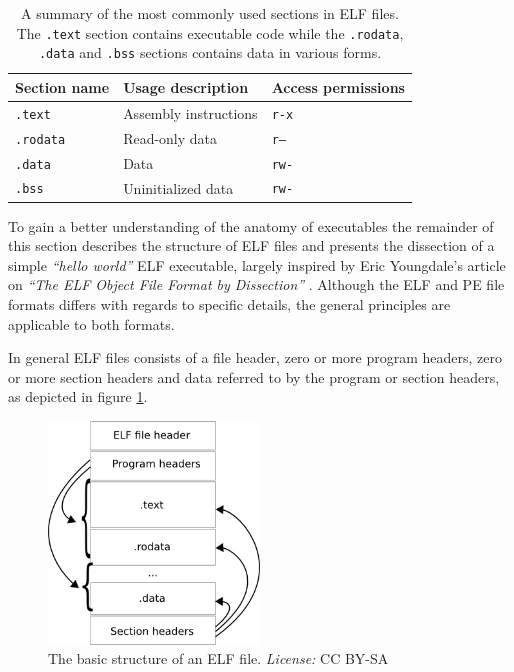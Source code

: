 \documentclass[12pt, a4paper]{article}
\begin{document}
\begin{table}[htbp]
	\begin{center}
		\begin{tabular}{|l|l|l|}
			\hline
			Section name & Usage description & Access permissions \\
			\hline
			\texttt{.text} & Assembly instructions & \texttt{r-x} \\
			\texttt{.rodata} & Read-only data & \texttt{r--} \\
			\texttt{.data} & Data & \texttt{rw-} \\
			\texttt{.bss} & Uninitialized data & \texttt{rw-} \\
			\hline
		\end{tabular}
	\end{center}
	\caption{A summary of the most commonly used sections in ELF files. The \texttt{.text} section contains executable code while the \texttt{.rodata}, \texttt{.data} and \texttt{.bss} sections contains data in various forms.}
	\label{sections}
\end{table}

To gain a better understanding of the anatomy of executables the remainder of this section describes the structure of ELF files and presents the dissection of a simple \textit{``hello world''} ELF executable, largely inspired by Eric Youngdale's article on \textit{``The ELF Object File Format by Dissection''} \cite{elf_dissection}. Although the ELF and PE file formats differs with regards to specific details, the general principles are applicable to both formats.

In general ELF files consists of a file header, zero or more program headers, zero or more section headers and data referred to by the program or section headers, as depicted in figure \ref{elf_structure}.

\begin{figure}[htbp]
	\begin{center}
		\includegraphics[width=0.5\textwidth]{inc/elf_structure.png}
		\caption{The basic structure of an ELF file. \textit{License:} CC BY-SA \cite{elf_structure_orig}}
		\label{elf_structure}
	\end{center}
\end{figure}
\end{document}
